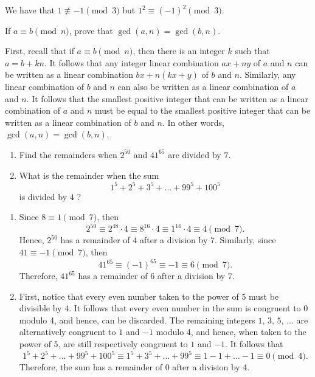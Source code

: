 \begin{solution}
    We have that $1 \not\equiv -1 \pmod 3$ but $1^2 \equiv (-1)^2 \pmod 3$.\\
\end{solution}

\begin{exercise}
    If $a \equiv b \pmod n$, prove that $\gcd(a,n) = \gcd(b,n)$.\\
\end{exercise}

\begin{solution}
    First, recall that if $a \equiv b \pmod n$, then there is an integer $k$ such that $a = b + kn$. It follows that any integer linear combination $ax + ny$ of $a$ and $n$ can be written as a linear combination $bx + n(kx + y)$ of $b$ and $n$. Similarly, any linear combination of $b$ and $n$ can also be written as a linear combination of $a$ and $n$. It follows that the smallest positive integer that can be written as a linear combination of $a$ and $n$ must be equal to the smallest positive integer that can be written as a linear combination of $b$ and $n$. In other words, $\gcd(a,n) = \gcd(b,n)$. \\
\end{solution}
    
\begin{exercise}
    \begin{enumerate}
        \item Find the remainders when $2^{50}$ and $41^{65}$ are divided by $7$.
        \item What is the remainder when the sum
        $$1^5 + 2^5 + 3^5 + \dots + 99^5 + 100^5$$
        is divided by $4$ ?
    \end{enumerate}
\end{exercise}

\begin{solution}
    \begin{enumerate}
        \item Since $8 \equiv 1 \pmod 7$, then
        $$2^{50} \equiv 2^{48}\cdot 4 \equiv 8^{16}\cdot 4 \equiv 1^{16}\cdot 4 \equiv 4 \pmod 7.$$
        Hence, $2^{50}$ has a remainder of $4$ after a division by $7$. Similarly, since $41 \equiv -1 \pmod 7$, then 
        $$41^{65} \equiv (-1)^{65} \equiv -1 \equiv 6 \pmod 7.$$
        Therefore, $41^{65}$ has a remainder of $6$ after a division by 7.
        \item First, notice that every even number taken to the power of $5$ must be divisible by $4$. It follows that every even number in the sum is congruent to $0$ modulo 4, and hence, can be discarded. The remaining integers $1$, $3$, $5$, ... are alternatively congruent to $1$ and $-1$ modulo 4, and hence, when taken to the power of 5, are still respectively congruent to $1$ and $-1$. It follows that
        $$1^5 + 2^5 + \dots + 99^5 + 100^5 \equiv 1^5 + 3^5 + \dots + 99^5 \equiv 1 - 1 + \dots - 1 \equiv 0 \pmod 4.$$
        Therefore, the sum has a remainder of 0 after a division by 4.
    \end{enumerate}
\end{solution}

